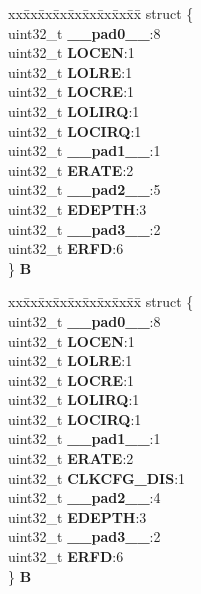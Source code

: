 \begin{DoxyCompactItemize}
\begin{tabbing}
\end{tabbing}\item 
\mbox{\label{unionFMPLL__tag_1_1FMPLL__ESYNCR2__tag_aeb3e7b4bd03c6c35f8efa6415e29359e}} 
\begin{tabbing}
xx\=xx\=xx\=xx\=xx\=xx\=xx\=xx\=xx\=\kill
struct \{\\
\>uint32\_t {\bfseries \_\_pad0\_\_}:8\\
\>uint32\_t {\bfseries LOCEN}:1\\
\>uint32\_t {\bfseries LOLRE}:1\\
\>uint32\_t {\bfseries LOCRE}:1\\
\>uint32\_t {\bfseries LOLIRQ}:1\\
\>uint32\_t {\bfseries LOCIRQ}:1\\
\>uint32\_t {\bfseries \_\_pad1\_\_}:1\\
\>uint32\_t {\bfseries ERATE}:2\\
\>uint32\_t {\bfseries \_\_pad2\_\_}:5\\
\>uint32\_t {\bfseries EDEPTH}:3\\
\>uint32\_t {\bfseries \_\_pad3\_\_}:2\\
\>uint32\_t {\bfseries ERFD}:6\\
\} {\bfseries B}\\

\end{tabbing}\item 
\mbox{\label{unionFMPLL__tag_1_1FMPLL__ESYNCR2__tag_a8c3e9a580e6dbb81b50273cd9ff58c6d}} 
\begin{tabbing}
xx\=xx\=xx\=xx\=xx\=xx\=xx\=xx\=xx\=\kill
struct \{\\
\>uint32\_t {\bfseries \_\_pad0\_\_}:8\\
\>uint32\_t {\bfseries LOCEN}:1\\
\>uint32\_t {\bfseries LOLRE}:1\\
\>uint32\_t {\bfseries LOCRE}:1\\
\>uint32\_t {\bfseries LOLIRQ}:1\\
\>uint32\_t {\bfseries LOCIRQ}:1\\
\>uint32\_t {\bfseries \_\_pad1\_\_}:1\\
\>uint32\_t {\bfseries ERATE}:2\\
\>uint32\_t {\bfseries CLKCFG\_DIS}:1\\
\>uint32\_t {\bfseries \_\_pad2\_\_}:4\\
\>uint32\_t {\bfseries EDEPTH}:3\\
\>uint32\_t {\bfseries \_\_pad3\_\_}:2\\
\>uint32\_t {\bfseries ERFD}:6\\
\} {\bfseries B}\\

\end{tabbing}\end{DoxyCompactItemize}


